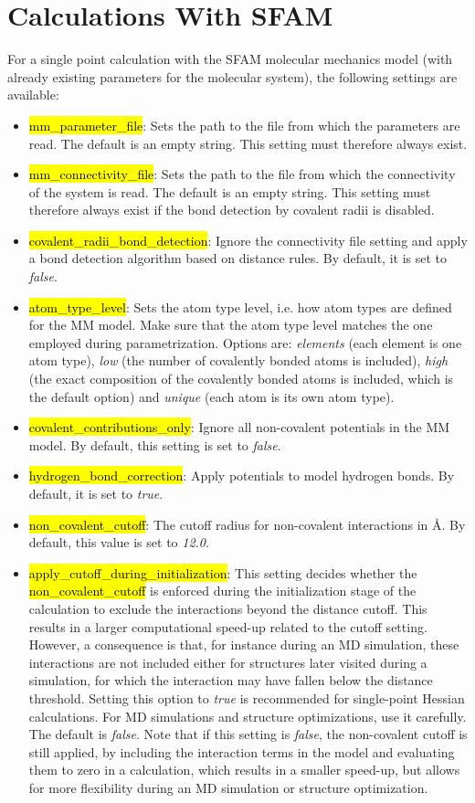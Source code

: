 \documentclass[]{tufte-book}
\begin{document}
{{\chapter{Calculations With SFAM}\label{ch:mm_calculation}
\label{sec:sfam_calc}

For a single point calculation with the SFAM molecular mechanics model (with already existing parameters for the molecular system), the following settings are available:

\begin{itemize}
\item \hl{mm\_parameter\_file}: Sets the path to the file from which the parameters are read. The default is an empty string. This setting must therefore always exist.
\item \hl{mm\_connectivity\_file}: Sets the path to the file from which the connectivity of the system is read. The default is an empty string. This setting must therefore always exist if the bond detection by covalent radii is disabled.
\item \hl{covalent\_radii\_bond\_detection}: Ignore the connectivity file setting and apply a bond detection algorithm based on distance rules. By default, it is set to \textit{false}.
\item \hl{atom\_type\_level}: Sets the atom type level, i.e. how atom types are defined for the MM model. Make sure that the atom type level matches the one employed during parametrization. Options are: \textit{elements} (each element is one atom type), \textit{low} (the number of covalently bonded atoms is included), \textit{high} (the exact composition of the covalently bonded atoms is included, which is the default option) and \textit{unique} (each atom is its own atom type).
\item \hl{covalent\_contributions\_only}: Ignore all non-covalent potentials in the MM model. By default, this setting is set to \textit{false}.
\item \hl{hydrogen\_bond\_correction}: Apply potentials to model hydrogen bonds. By default, it is set to \textit{true}.
\item \hl{non\_covalent\_cutoff}: The cutoff radius for non-covalent interactions in \AA. By default, this value is set to \textit{12.0}.
\item \hl{apply\_cutoff\_during\_initialization}: This setting decides whether the \hl{non\_covalent\_cutoff} is enforced during the initialization stage of the calculation to exclude the interactions beyond the distance cutoff. This results in a larger computational speed-up related to the cutoff setting. However, a consequence is that, for instance during an MD simulation, these interactions are not included either for structures later visited during a simulation, for which the interaction may have fallen below the distance threshold. Setting this option to \textit{true} is recommended for single-point Hessian calculations. For MD simulations and structure optimizations, use it carefully. The default is \textit{false}. Note that if this setting is \textit{false}, the non-covalent cutoff is still applied, by including the interaction terms in the model and evaluating them to zero in a calculation, which results in a smaller speed-up, but allows for more flexibility during an MD simulation or structure optimization.

\end{itemize}}}
\end{document}
